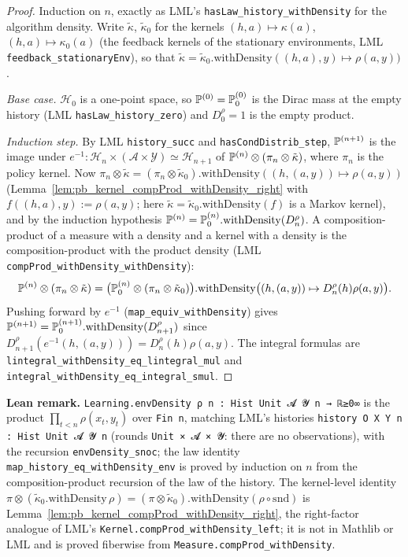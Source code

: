 \begin{proof}
\leanok
{}
Induction on $n$, exactly as LML's \texttt{hasLaw\_history\_withDensity} for the algorithm
density. Write $\tilde\kappa$, $\tilde\kappa_0$ for the kernels $(h,a)\mapsto\kappa(a)$,
$(h,a)\mapsto\kappa_0(a)$ (the feedback kernels of the stationary environments, LML
\texttt{feedback\_stationaryEnv}), so that
$\tilde\kappa = \tilde\kappa_0.\mathrm{withDensity}((h,a),y)\mapsto\rho(a,y))$.

\emph{Base case.} $\mathcal{H}_0$ is a one-point space, so $\mathbb{P}^{(0)} = \mathbb{P}_0^{(0)}$ is the
Dirac mass at the empty history (LML \texttt{hasLaw\_history\_zero}) and
$D_0^\rho = 1$ is the empty product.

\emph{Induction step.} By LML \texttt{history\_succ} and \texttt{hasCondDistrib\_step},
$\mathbb{P}^{(n+1)}$ is the image under $e^{-1} : \mathcal{H}_n\times(\mathcal{A}\times\mathcal{Y})\simeq\mathcal{H}_{n+1}$
of $\mathbb{P}^{(n)}\otimes(\pi_n\otimes\tilde\kappa)$, where $\pi_n$ is the policy kernel. Now
$\pi_n\otimes\tilde\kappa = (\pi_n\otimes\tilde\kappa_0).\mathrm{withDensity}((h,(a,y))\mapsto\rho(a,y))$
(Lemma~\ref{lem:pb_kernel_compProd_withDensity_right} with $f((h,a),y) := \rho(a,y)$; here
$\tilde\kappa = \tilde\kappa_0.\mathrm{withDensity}(f)$ is a Markov kernel), and by the
induction hypothesis
$\mathbb{P}^{(n)} = \mathbb{P}_0^{(n)}.\mathrm{withDensity}(D_n^\rho)$. A composition-product of a measure
with a density and a kernel with a density is the composition-product with the product
density (LML \texttt{compProd\_withDensity\_withDensity}):
\[
  \mathbb{P}^{(n)}\otimes(\pi_n\otimes\tilde\kappa)
  = \big(\mathbb{P}_0^{(n)}\otimes(\pi_n\otimes\tilde\kappa_0)\big).\mathrm{withDensity}\big((h,(a,y))\mapsto D_n^\rho(h)\rho(a,y)\big).
\]
Pushing forward by $e^{-1}$ (\texttt{map\_equiv\_withDensity}) gives
$\mathbb{P}^{(n+1)} = \mathbb{P}_0^{(n+1)}.\mathrm{withDensity}(D_{n+1}^\rho)$ since
$D_{n+1}^\rho(e^{-1}(h,(a,y))) = D_n^\rho(h)\rho(a,y)$. The integral formulas are
\texttt{lintegral\_withDensity\_eq\_lintegral\_mul} and
\texttt{integral\_withDensity\_eq\_integral\_smul}.
\end{proof}

\textbf{Lean remark.} \texttt{Learning.envDensity ρ n : Hist Unit 𝓐 𝓨 n → ℝ≥0∞} is the
product $\prod_{t<n}\rho(x_t,y_t)$ over \texttt{Fin n}, matching LML's histories
\texttt{history O X Y n : Hist Unit 𝓐 𝓨 n} (rounds \texttt{Unit × 𝓐 × 𝓨}: there are no
observations), with the recursion \texttt{envDensity\_snoc}; the law
identity \texttt{map\_history\_eq\_withDensity\_env} is proved by induction on $n$ from the
composition-product recursion of the law of the history. The kernel-level identity
$\pi\otimes(\tilde\kappa_0.\mathrm{withDensity}\,\rho) = (\pi\otimes\tilde\kappa_0).\mathrm{withDensity}(\rho\circ\mathrm{snd})$
is Lemma~\ref{lem:pb_kernel_compProd_withDensity_right}, the right-factor analogue of LML's
\texttt{Kernel.compProd\_withDensity\_left}; it is not in Mathlib or LML and is proved
fiberwise from \texttt{Measure.compProd\_withDensity}.


